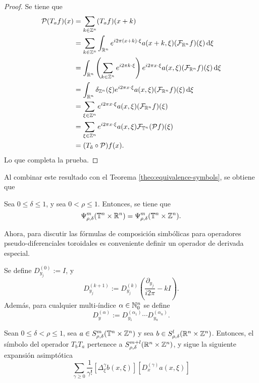 \begin{proof}
	Se tiene que 
	\begin{align*}
		\mathcal{P}(T_af)(x) & = \sum_{k\in\mathbb{Z}^n}(T_af)(x+k)\\
		& = \sum_{k\in\mathbb{Z}^n}\int_{\mathbb{R}^n} e^{i2\pi(x+k)\cdot\xi}a(x+k, \xi)(\mathcal{F}_{\mathbb{R}^n}f)(\xi) \mathop{}\!\mathrm{d} \xi \\
		& = \int_{\mathbb{R}^n}\left(\sum_{k\in\mathbb{Z}^n}e^{i2\pi k\cdot\xi}\right) e^{i2\pi x\cdot\xi}a(x, \xi)(\mathcal{F}_{\mathbb{R}^n}f)(\xi) \mathop{}\!\mathrm{d} \xi \\
		& = \int_{\mathbb{R}^n}\delta_{\mathbb{Z}^n}(\xi) e^{i2\pi x\cdot\xi}a(x, \xi)(\mathcal{F}_{\mathbb{R}^n}f)(\xi) \mathop{}\!\mathrm{d} \xi \\
		& = \sum_{\xi\in\mathbb{Z}^n}e^{i2\pi x\cdot\xi}a(x, \xi)(\mathcal{F}_{\mathbb{R}^n}f)(\xi) \\
		& = \sum_{\xi\in\mathbb{Z}^n}e^{i2\pi x\cdot\xi}a(x, \xi)\mathcal{F}_{\mathbb{T}^n}(\mathcal{P}f)(\xi)  \\
		& = (T_{\tilde{a}}\circ\mathcal{P})f(x).
	\end{align*}
	Lo que completa la prueba.
\end{proof}
Al combinar este resultado con el Teorema \ref{theo:equivalence-symbols}, se obtiene que 
\begin{corollary}
	Sea $0\leq\delta\leq1$, y sea $0<\rho\leq1$. Entonces, se tiene que 
	\begin{equation*}
		\Psi^m_{\rho,\delta}(\mathbb{T}^n\times\mathbb{R}^n) = \Psi^m_{\rho,\delta}(\mathbb{T}^n\times\mathbb{Z}^n).
	\end{equation*}
\end{corollary}
Ahora, para discutir las fórmulas de composición simbólicas para operadores pseudo-diferenciales toroidales es conveniente definir un operador de derivada especial.
\begin{definition}
	Se define $D_{y_j}^{(0)} := I$, y 
	\begin{equation*}
		D_{y_j}^{(k+1)} := D_{y_j}^{(k)} \left(\frac{\partial_{y_j}}{i2\pi}-kI\right).
	\end{equation*}
	Además, para cualquier multi-índice $\alpha\in\mathbb{N}_0^n$ se define
	\begin{equation*}
		D^{(\alpha)}_y := D^{(\alpha_1)}_{y_1} \cdots D^{(\alpha_n)}_{y_n}.
	\end{equation*}
\end{definition}
\begin{theorem}
	Sean $0\leq\delta<\rho\leq1$, sea $a\in S^m_{\rho, \delta}(\mathbb{T}^n\times\mathbb{Z}^n)$ y sea $b\in S^l_{\rho, \delta}(\mathbb{R}^n\times\mathbb{Z}^n)$. Entonces, el símbolo del operador $T_bT_a$ pertenece a $S^{m+l}_{\rho, \delta}(\mathbb{R}^n\times\mathbb{Z}^n)$, y sigue la siguiente expansión asimptótica
	\begin{equation*}
		\sum_{\gamma\geq0} \frac{1}{\gamma!}[\Delta^\gamma_\xi b(x, \xi)][D^{(\gamma)}_xa(x, \xi)]
	\end{equation*}
\end{theorem}

